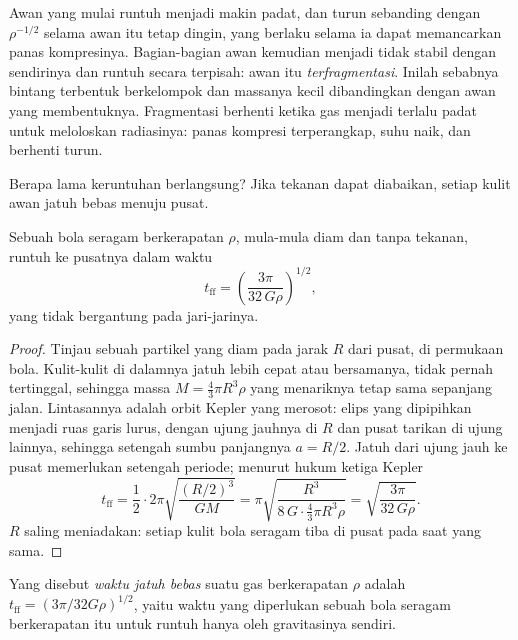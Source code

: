 Awan yang mulai runtuh menjadi makin padat, dan  turun sebanding dengan
$\rho^{-1/2}$ selama awan itu tetap dingin, yang berlaku selama ia dapat memancarkan
panas kompresinya. Bagian-bagian awan kemudian menjadi tidak stabil dengan sendirinya
dan runtuh secara terpisah: awan itu \emph{terfragmentasi}. Inilah sebabnya bintang
terbentuk berkelompok dan massanya kecil dibandingkan dengan awan yang membentuknya.
Fragmentasi berhenti ketika gas menjadi terlalu padat untuk meloloskan radiasinya:
panas kompresi terperangkap, suhu naik, dan 
berhenti turun.

Berapa lama keruntuhan berlangsung? Jika tekanan dapat diabaikan, setiap kulit awan
jatuh bebas menuju pusat.

\begin{proposition}\label{prop:b2:ism-star-formation:free-fall}
Sebuah bola seragam berkerapatan $\rho$, mula-mula diam dan tanpa tekanan,
runtuh ke pusatnya dalam waktu
\[
  t_{\mathrm{ff}} = \left(\frac{3\pi}{32\,G\rho}\right)^{1/2},
\]
yang tidak bergantung pada jari-jarinya.
\end{proposition}

\begin{proof}
Tinjau sebuah partikel yang diam pada jarak $R$ dari pusat, di permukaan bola. Kulit-kulit
di dalamnya jatuh lebih cepat atau bersamanya, tidak pernah tertinggal, sehingga massa
$M = \tfrac43\pi R^3\rho$ yang menariknya tetap sama sepanjang jalan. Lintasannya adalah
orbit Kepler yang merosot: elips yang dipipihkan menjadi ruas garis lurus, dengan ujung
jauhnya di $R$ dan pusat tarikan di ujung lainnya, sehingga setengah sumbu panjangnya
$a = R/2$. Jatuh dari ujung jauh ke pusat memerlukan setengah periode; menurut hukum
ketiga Kepler
\[
  t_{\mathrm{ff}} = \frac12\cdot 2\pi\sqrt{\frac{(R/2)^3}{GM}}
  = \pi\sqrt{\frac{R^3}{8\,G\cdot\frac43\pi R^3\rho}}
  = \sqrt{\frac{3\pi}{32\,G\rho}} .
\]
$R$ saling meniadakan: setiap kulit bola seragam tiba di pusat pada saat yang
sama.
\end{proof}

\begin{definition}\label{def:b2:ism-star-formation:free-fall}
Yang disebut \emph{waktu jatuh bebas} suatu gas berkerapatan $\rho$ adalah
$t_{\mathrm{ff}} = (3\pi/32G\rho)^{1/2}$, yaitu waktu yang diperlukan sebuah bola seragam
berkerapatan itu untuk runtuh hanya oleh gravitasinya sendiri.
\end{definition}

